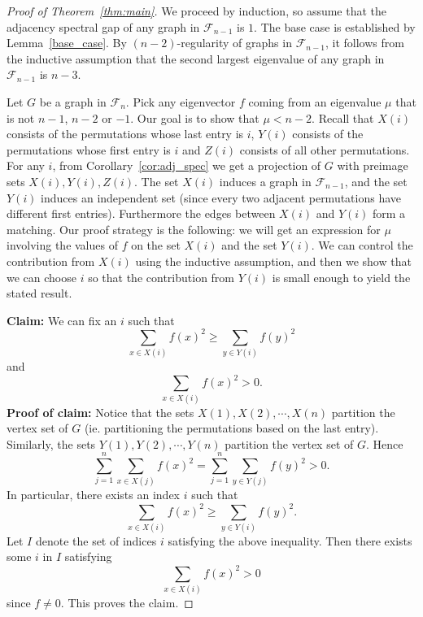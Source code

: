 \begin{proof}[Proof of Theorem~\ref{thm:main}]
  We proceed by induction,
  so assume that the adjacency spectral gap of any graph in $\mathcal{F}_{n-1}$ is $1$.  
  The base case is established by Lemma~\ref{base_case}.  By $(n-2)$-regularity of graphs
  in $\mathcal{F}_{n-1}$, it follows from the inductive assumption that the second largest
  eigenvalue of any graph in $\mathcal{F}_{n-1}$ is $n-3$.


  Let $G$ be a graph in $\mathcal{F}_{n}$.
  Pick any eigenvector $f$ coming from an eigenvalue $\mu$ that is not
  $n-1$, $n-2$ or $-1$.  Our goal is to show that $\mu < n-2$.
  Recall that $X(i)$ consists of the permutations whose 
  last entry is $i$, $Y(i)$ consists of the permutations whose first entry is
  $i$ and $Z(i)$ consists of all other permutations.  For any $i$, from 
  Corollary~\ref{cor:adj_spec}
  we get a projection of $G$ with preimage sets 
  $X(i), Y(i), Z(i)$.
  The set $X(i)$ induces a graph in $\mathcal{F}_{n-1}$, and the set $Y(i)$
  induces an independent set (since every two adjacent permutations have
  different first entries).
  Furthermore the edges between $X(i)$ and 
  $Y(i)$ form a matching.  Our proof strategy is the following:  we will
  get an expression for $\mu$ involving the values of $f$ on the 
  set $X(i)$ and the set $Y(i)$.  We can control the contribution from 
  $X(i)$ using the inductive assumption, and then we show that we can
  choose $i$ so that the contribution from $Y(i)$ is small enough
  to yield the stated result.
  
  
  \vspace*{1mm}
  \noindent \textbf{Claim:} We can fix an $i$ such that 
   \begin{equation}\label{eqn:gap_max}
     \sum_{x \in X(i)} f(x)^2 \geq \sum_{y \in Y(i)} f(y)^2
   \end{equation}
   and 
   \[ \sum_{x \in X(i)} f(x)^2 > 0. \]
   \textbf{Proof of claim:} Notice that the sets $X(1), X(2), \cdots, X(n)$
  partition the vertex set of $G$ (ie.  partitioning the permutations
  based on the last entry).  Similarly, the sets 
  $Y(1), Y(2), \cdots, Y(n)$ partition the vertex set of $G$.
  Hence
   \[ \sum_{j=1}^n \sum_{x \in X(j)} f(x)^2 = \sum_{j=1}^n \sum_{y \in Y(j)} f(y)^2 >0 . \]
  In particular, there exists an index $i$ such that 
   \begin{equation*}
     \sum_{x \in X(i)} f(x)^2 \geq \sum_{y \in Y(i)} f(y)^2.
   \end{equation*}
Let $I$  denote the set of indices $i$ satisfying the above inequality. Then there exists some $i$ in $I$ satisfying
   \begin{equation*}
     \sum_{x \in X(i)} f(x)^2 > 0
   \end{equation*}
  since $f \not = 0$. This proves the claim.
  

\end{proof}
